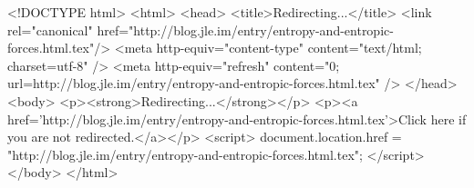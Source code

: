 <!DOCTYPE html>
<html>
<head>
<title>Redirecting...</title>
<link rel="canonical" href="http://blog.jle.im/entry/entropy-and-entropic-forces.html.tex"/>
<meta http-equiv="content-type" content="text/html; charset=utf-8" />
<meta http-equiv="refresh" content="0; url=http://blog.jle.im/entry/entropy-and-entropic-forces.html.tex" />
</head>
<body>
  <p><strong>Redirecting...</strong></p>
  <p><a href='http://blog.jle.im/entry/entropy-and-entropic-forces.html.tex'>Click here if you are not redirected.</a></p>
  <script>
    document.location.href = "http://blog.jle.im/entry/entropy-and-entropic-forces.html.tex";
  </script>
</body>
</html>
